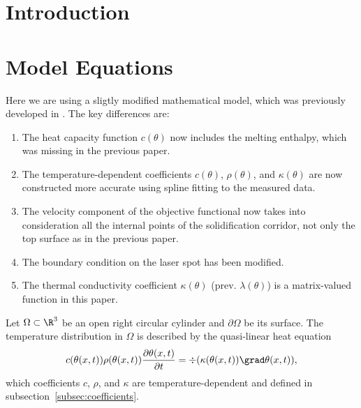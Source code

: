 \section{Introduction}
\label{sec:introduction}

\section{Model Equations}
\label{sec:modelling}

{\color{ TolHighContrastBlue}
Here we are using a sligtly modified mathematical model, which was previously developed in \cite{BergmannBieleninHerzogHildebrandRiedelSchrickerTrunkWorthmann:2017:1}.
The key differences are:
\begin{enumerate}
	\item The heat capacity function $c(\theta)$ now includes the melting enthalpy, which was missing in the previous paper.
	\item The temperature-dependent coefficients $c(\theta)$, $\rho(\theta)$, and $\kappa(\theta)$ are now constructed more accurate using spline fitting to the measured data.
	\item The velocity component of the objective functional now takes into consideration all the internal points of the solidification corridor, not only the top surface as in the previous paper.
	\item The boundary condition on the laser spot has been modified.
	\item The thermal conductivity coefficient $\kappa(\theta)$ (prev. $\lambda(\theta)$) is a matrix-valued function in this paper.
\end{enumerate}
}

Let $\Omega	\subset \R^3$ be an open right circular cylinder and $\partial\Omega$ be its surface. The temperature distribution in $\Omega$ is described by the quasi-linear heat equation
\begin{equation} \label{eq:heat_eq}
	c(\theta(x,t)) \rho(\theta(x,t)) \frac{\partial \theta(x,t)}{\partial t} = \div (\kappa(\theta(x,t)) \grad\theta(x,t)),
\end{equation}
which coefficients $c$, $\rho$, and $\kappa$ are temperature-dependent and defined in subsection~\ref{subsec:coefficients}.

